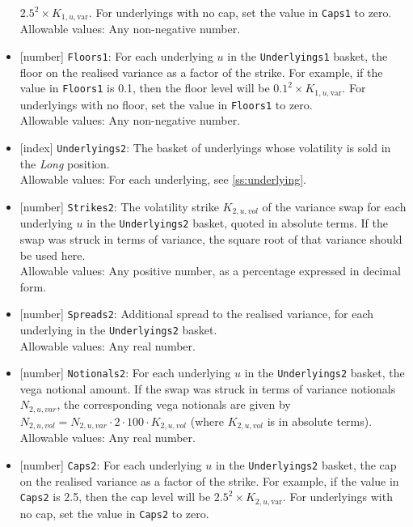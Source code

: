 \begin{itemize}
  $2.5^2 \times K_{1,u,\text{var}}$. For underlyings with no cap, set the value in \lstinline!Caps1! to zero. \\
  Allowable values: Any non-negative number.
  \item{}[number] \lstinline!Floors1!: For each underlying $u$ in the \lstinline!Underlyings1! basket, the floor on the realised
  variance as a factor of the strike. For example, if the value in \lstinline!Floors1! is 0.1, then the floor level will
  be $0.1^2 \times K_{1,u,\text{var}}$. For underlyings with no floor, set the value in \lstinline!Floors1! to zero. \\
  Allowable values: Any non-negative number.
  \item{}[index] \lstinline!Underlyings2!: The basket of underlyings whose volatility is sold in the \emph{Long} position.\\
  Allowable values: For each underlying, see \ref{ss:underlying}.
  \item{}[number] \lstinline!Strikes2!: The volatility strike $K_{2,u,vol}$ of the variance swap for each underlying $u$
  in the \lstinline!Underlyings2! basket, quoted in absolute terms. If the swap was
  struck in terms of variance, the square root of that variance should be used here.\\
  Allowable values: Any positive number, as a percentage expressed in decimal form.
  \item{}[number] \lstinline!Spreads2!: Additional spread to the realised variance, for each underlying in the
  \lstinline!Underlyings2! basket. \\
  Allowable values: Any real number.
  \item{}[number] \lstinline!Notionals2!: For each underlying $u$ in the \lstinline!Underlyings2! basket, the vega notional amount.
  If the swap was struck in terms of variance notionals $N_{2,u,var}$, the corresponding vega notionals are given by
  $N_{2,u,vol} = N_{2,u,var} \cdot 2 \cdot 100 \cdot K_{2,u,vol}$ (where $K_{2,u,vol}$ is in
  absolute terms). \\
  Allowable values: Any real number.
  \item{}[number] \lstinline!Caps2!: For each underlying $u$ in the \lstinline!Underlyings2! basket, the cap on the realised variance
  as a factor of the strike. For example, if the value in  \lstinline!Caps2! is 2.5, then the cap level will be
  $2.5^2 \times K_{2,u,\text{var}}$. For underlyings with no cap, set the value in \lstinline!Caps2! to zero. \\

\end{itemize}
